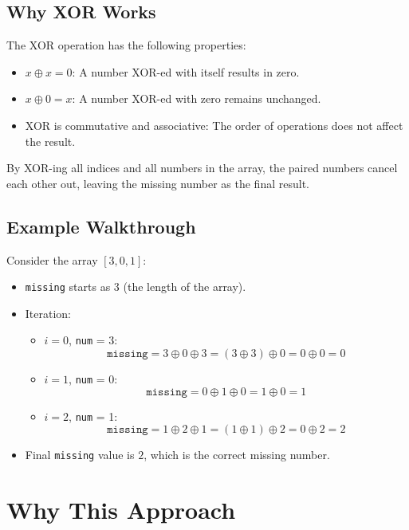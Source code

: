 \subsection*{Why XOR Works}

The XOR operation has the following properties:
\begin{itemize}
    \item \(x \oplus x = 0\): A number XOR-ed with itself results in zero.
    \item \(x \oplus 0 = x\): A number XOR-ed with zero remains unchanged.
    \item XOR is commutative and associative: The order of operations does not affect the result.
\end{itemize}

By XOR-ing all indices and all numbers in the array, the paired numbers cancel each other out, leaving the missing number as the final result.

\subsection*{Example Walkthrough}

Consider the array \([3,0,1]\):

\begin{itemize}
    \item \texttt{missing} starts as \(3\) (the length of the array).
    
    \item Iteration:
    \begin{itemize}
        \item \(i = 0\), \texttt{num} = 3:
        \[
        \texttt{missing} = 3 \oplus 0 \oplus 3 = (3 \oplus 3) \oplus 0 = 0 \oplus 0 = 0
        \]
        
        \item \(i = 1\), \texttt{num} = 0:
        \[
        \texttt{missing} = 0 \oplus 1 \oplus 0 = 1 \oplus 0 = 1
        \]
        
        \item \(i = 2\), \texttt{num} = 1:
        \[
        \texttt{missing} = 1 \oplus 2 \oplus 1 = (1 \oplus 1) \oplus 2 = 0 \oplus 2 = 2
        \]
    \end{itemize}
    
    \item Final \texttt{missing} value is \(2\), which is the correct missing number.
\end{itemize}

\section*{Why This Approach}

